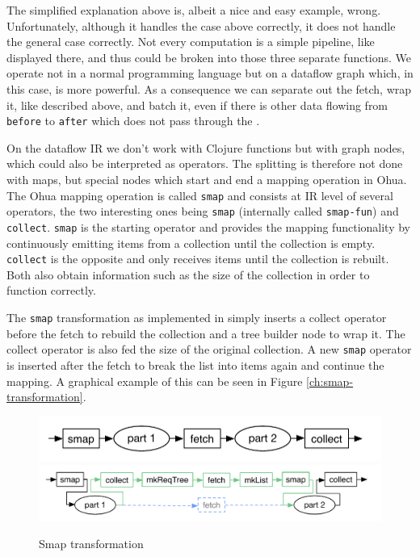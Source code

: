 The simplified explanation above is, albeit a nice and easy example, wrong.
Unfortunately, although it handles the case above correctly, it does not handle the general case correctly.
Not every computation is a simple pipeline, like displayed there, and thus could be broken into those three separate functions.
We operate not in a normal programming language but on a dataflow graph which, in this case, is more powerful.
As a consequence we can separate out the fetch, wrap it, like described above, and batch it, even if there is other data flowing from \texttt{before} to \texttt{after} which does not pass through the \fetch{}.

On the dataflow IR we don't work with Clojure functions but with graph nodes, which could also be interpreted as operators.
The splitting is therefore not done with maps, but special nodes which start and end a mapping operation in Ohua.
The Ohua mapping operation is called \texttt{smap} and consists at IR level of several operators, the two interesting ones being \texttt{smap} (internally called \texttt{smap-fun}) and \texttt{collect}.
\texttt{smap} is the starting operator and provides the mapping functionality by continuously emitting items from a collection until the collection is empty.
\texttt{collect} is the opposite and only receives items until the collection is rebuilt.
Both also obtain information such as the size of the collection in order to function correctly.

The \texttt{smap} transformation as implemented in \yauhau{} simply inserts a collect operator before the fetch to rebuild the collection and a tree builder node to wrap it.
The collect operator is also fed the size of the original collection.
A new \texttt{smap} operator is inserted after the fetch to break the list into items again and continue the mapping.
A graphical example of this can be seen in Figure \ref{ch:smap-transformation}.

\begin{figure}[h]
	\includegraphics[width=\textwidth]{Figures/smap-rewrite-original}
	\includegraphics[width=\textwidth]{Figures/smap-rewrite}
	\label{figure:smap-transformation}
	\caption{Smap transformation}
\end{figure}

